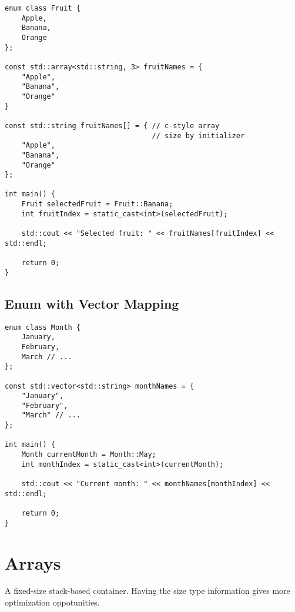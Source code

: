 \documentclass[openany]{report}
\begin{document}
\begin{verbatim}
enum class Fruit {
    Apple,
    Banana,
    Orange
};

const std::array<std::string, 3> fruitNames = {
    "Apple",
    "Banana",
    "Orange"
}

const std::string fruitNames[] = { // c-style array
                                   // size by initializer
    "Apple",
    "Banana",
    "Orange"
};

int main() {
    Fruit selectedFruit = Fruit::Banana;
    int fruitIndex = static_cast<int>(selectedFruit);

    std::cout << "Selected fruit: " << fruitNames[fruitIndex] << std::endl;

    return 0;
}
\end{verbatim}

\subsection{Enum with Vector Mapping}

\begin{verbatim}
enum class Month {
    January,
    February,
    March // ...
};

const std::vector<std::string> monthNames = {
    "January",
    "February",
    "March" // ... 
};

int main() {
    Month currentMonth = Month::May;
    int monthIndex = static_cast<int>(currentMonth);

    std::cout << "Current month: " << monthNames[monthIndex] << std::endl;

    return 0;
}
\end{verbatim}


\section{Arrays}

A fixed-size stack-based container. Having the size type information gives more optimization oppotunities.
\end{document}
